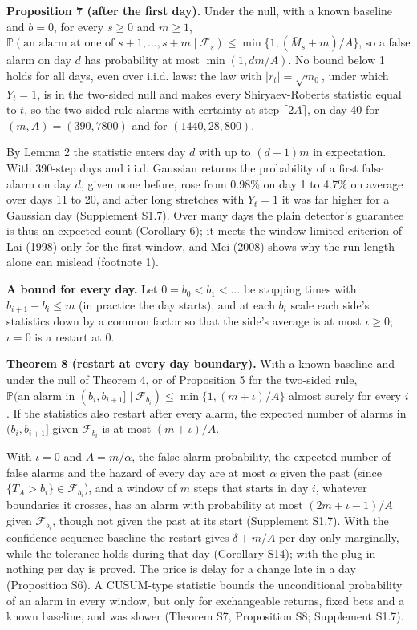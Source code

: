 \documentclass[
]{article}
\begin{document}
\textbf{Proposition 7 (after the first day).} Under the null, with a
known baseline and \(b = 0\), for every \(s \ge 0\) and \(m \ge 1\),
\(\mathbb{P}(\text{an alarm at one of } s + 1, \dots, s + m \mid \mathcal{F}_s) \le \min\lbrace 1, (\bar M_s + m)/A\rbrace\),
so a false alarm on day \(d\) has probability at most \(\min(1, dm/A)\).
No bound below 1 holds for all days, even over i.i.d. laws: the law with
\(\lvert r_t\rvert = \sqrt{m_0}\), under which \(Y_t = 1\), is in the
two-sided null and makes every Shiryaev-Roberts statistic equal to
\(t\), so the two-sided rule alarms with certainty at step
\(\lceil 2A\rceil\), on day 40 for \((m, A) = (390, 7800)\) and for
\((1440, 28{,}800)\).

By Lemma 2 the statistic enters day \(d\) with up to \((d-1)m\) in
expectation. With 390-step days and i.i.d. Gaussian returns the
probability of a first false alarm on day \(d\), given none before, rose
from 0.98\% on day 1 to 4.7\% on average over days 11 to 20, and after
long stretches with \(Y_t = 1\) it was far higher for a Gaussian day
(Supplement S1.7). Over many days the plain detector's guarantee is thus
an expected count (Corollary 6); it meets the window-limited criterion
of Lai (1998) only for the first window, and Mei (2008) shows why the
run length alone can mislead (footnote 1).

\textbf{A bound for every day.} Let \(0 = b_0 < b_1 < \dots\) be
stopping times with \(b_{i+1} - b_i \le m\) (in practice the day
starts), and at each \(b_i\) scale each side's statistics down by a
common factor so that the side's average is at most \(\iota \ge 0\);
\(\iota = 0\) is a restart at 0.

\textbf{Theorem 8 (restart at every day boundary).} With a known
baseline and under the null of Theorem 4, or of Proposition 5 for the
two-sided rule,
\(\mathbb{P}(\text{an alarm in } (b_i, b_{i+1}] \mid \mathcal{F}_{b_i}) \le \min\lbrace 1, (m + \iota)/A\rbrace\)
almost surely for every \(i\). If the statistics also restart after
every alarm, the expected number of alarms in \((b_i, b_{i+1}]\) given
\(\mathcal{F}_{b_i}\) is at most \((m + \iota)/A\).

With \(\iota = 0\) and \(A = m/\alpha\), the false alarm probability,
the expected number of false alarms and the hazard of every day are at
most \(\alpha\) given the past (since
\(\lbrace T_A > b_i\rbrace \in \mathcal{F}_{b_i}\)), and a window of
\(m\) steps that starts in day \(i\), whatever boundaries it crosses,
has an alarm with probability at most \((2m + \iota - 1)/A\) given
\(\mathcal{F}_{b_i}\), though not given the past at its start
(Supplement S1.7). With the confidence-sequence baseline the restart
gives \(\delta + m/A\) per day only marginally, while the tolerance
holds during that day (Corollary S14); with the plug-in nothing per day
is proved. The price is delay for a change late in a day (Proposition
S6). A CUSUM-type statistic bounds the unconditional probability of an
alarm in every window, but only for exchangeable returns, fixed bets and
a known baseline, and was slower (Theorem S7, Proposition S8; Supplement
S1.7).
\end{document}
